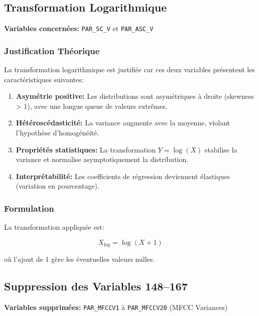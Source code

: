 \documentclass[11pt,a4paper,french]{report}
\begin{document}
\subsection{Transformation Logarithmique}

\textbf{Variables concernées:} \texttt{PAR\_SC\_V} et \texttt{PAR\_ASC\_V}

\subsubsection*{Justification Théorique}

La transformation logarithmique est justifiée car ces deux variables présentent les caractéristiques suivantes:

\begin{enumerate}
    \item \textbf{Asymétrie positive:} Les distributions sont asymétriques à droite (skewness > 1), avec une longue queue de valeurs extrêmes.
    
    \item \textbf{Hétéroscédasticité:} La variance augmente avec la moyenne, violant l'hypothèse d'homogénéité.
    
    \item \textbf{Propriétés statistiques:} La transformation $Y = \log(X)$ stabilise la variance et normalise asymptotiquement la distribution.
    
    \item \textbf{Interprétabilité:} Les coefficients de régression deviennent élastiques (variation en pourcentage).
\end{enumerate}

\subsubsection*{Formulation}

La transformation appliquée est:

\begin{equation}
X_{\text{log}} = \log(X + 1)
\end{equation}

où l'ajout de 1 gère les éventuelles valeurs nulles.

\subsection{Suppression des Variables 148--167}

\textbf{Variables supprimées:} \texttt{PAR\_MFCCV1} à \texttt{PAR\_MFCCV20} (MFCC Variances)
\end{document}
